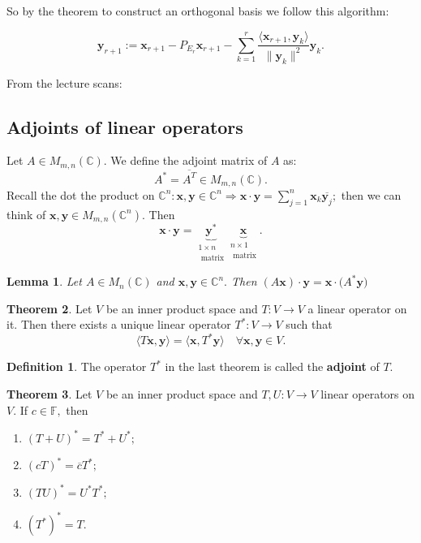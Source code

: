 \documentclass[12pt, a4paper]{article}
\newcommand{\bb}[1]{\mathbb{#1}}
\newcommand{\imply}{\Rightarrow}
\newcommand{\mb}[1]{\mathbf{#1}}
\theoremstyle{definition}
\newtheorem{definition}{Definition}[section]
\newtheorem{theorem}{Theorem}[section]
\theoremstyle{plain}
\newtheorem{lemma}[theorem]{Lemma}
\begin{document}
So by the theorem to construct an orthogonal basis we follow this algorithm: 
\begin{tcolorbox}
$$\mb{y}_{r+1}:=\mb{x}_{r+1}-P_{E_r}\mb{x}_{r+1}-\sum_{k=1}^{r}\frac{\langle \mb{x}_{r+1},\mb{y}_k \rangle}{\|\mb{y}_k\|^2}\mb{y}_k.$$
\end{tcolorbox}

From the lecture scans: 

\subsection{Adjoints of linear operators}

Let $A\in M_{m,n}(\bb{C}).$ We define the adjoint matrix of $A$ as: $$A^*=\overline{A^{T}}\in M_{m,n}(\bb{C}).$$ Recall the dot the product on $\bb{C}^n: \mb{x,y} \in \bb{C}^n \imply \mb{x\cdot y}=\sum_{j=1}^{n} \mb{x}_k\overline{\mb{y}_j};$ then we can think of $\mb{x,y}\in M_{m,n}(\bb{C}^n).$ Then $$\mb{x\cdot y}=\underbrace{\mb{y^*}}_{\substack{1\times n\\ \text{ matrix}}} \underbrace{\mb{x}}_{\substack{n\times 1 \\\text{ matrix}}}.$$

\begin{lemma}
Let $A\in M_n(\bb{C})$ and $\mb{x,y}\in \bb{C}^n.$ Then $(A\mb{x})\cdot\mb{y}=\mb{x}\cdot(A^*\mb{y)}$
\end{lemma}

\begin{theorem}
Let $V$ be an inner product space and $T : V \to V$ a linear operator on it. Then there exists a unique linear operator $T^* : V \to V$ such that $$\langle T\mb{x},\mb{y} \rangle= \langle  \mb{x},T^*\mb{y} \rangle \quad \forall\mb{x,y}\in V.$$
\end{theorem}

\begin{definition}
The operator $T^*$ in the last theorem is called the \textbf{adjoint} of $T .$
\end{definition}

\begin{theorem}
Let $V$ be an inner product space and $T,U : V \to V$ linear operators on $V$. If $c \in \bb{F},$ then \begin{enumerate}
	
	\item $(T+U)^*=T^*+U^*;$
	\item $(cT)^*=\overline{c}T^*;$
	\item $(TU)^*=U^*T^*;$
	\item $(T^*)^*=T.$

\end{enumerate}
\end{theorem}
\end{document}
